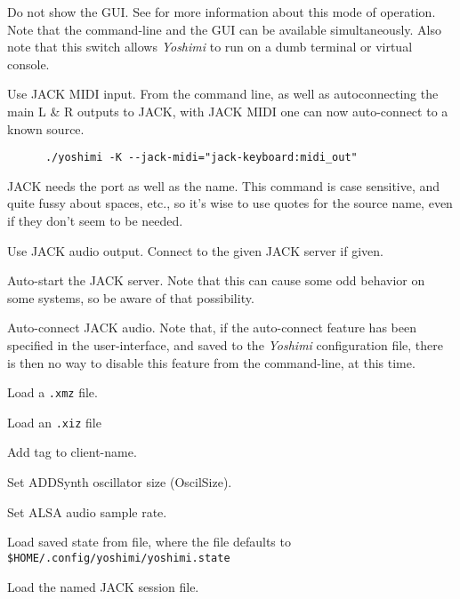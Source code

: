       Do not show the GUI.  See  for more
      information about this mode of operation.  Note that the command-line
      and the GUI can be available simultaneously.  Also note that this
      switch allows \textsl{Yoshimi} to run on a dumb terminal or virtual
      console.

      Use JACK MIDI input.
      From the command line, as well as autoconnecting the main L \& R
      outputs to JACK, with JACK MIDI one can now auto-connect to a known source.

   \begin{verbatim}
      ./yoshimi -K --jack-midi="jack-keyboard:midi_out"
   \end{verbatim}
   
   JACK needs the port as well as the name.
   This command is case sensitive, and quite fussy about spaces, etc.,
   so it's wise to use quotes for the source name, even if they don't seem to
   be needed.

      Use JACK audio output.
      Connect to the given JACK server if given.

      Auto-start the JACK server.
      Note that this can cause some odd behavior on some systems, so be aware of
      that possibility.

      Auto-connect JACK audio.  Note that, if the auto-connect feature has been
      specified in the user-interface, and saved to the \textsl{Yoshimi}
      configuration file, there is then no way to disable this feature from the
      command-line, at this time.

      Load a \texttt{.xmz} file.

      Load an \texttt{.xiz} file

      Add tag to client-name.

      Set ADDSynth oscillator size (OscilSize).

      Set ALSA audio sample rate.

      Load saved state from file, where the file defaults to
      \texttt{\$HOME/.config/yoshimi/yoshimi.state}

      Load the named JACK session file.

